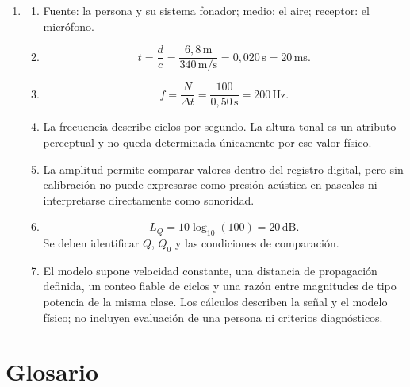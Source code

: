 \begin{enumerate}[label=\textbf{I\arabic*.},leftmargin=*]
    \item
    \begin{enumerate}[label=\alph*)]
        \item Fuente: la persona y su sistema fonador; medio: el aire; receptor: el micrófono.
        \item
        \[
            t=\frac{d}{c}
            =\frac{6{,}8\,\text{m}}{340\,\text{m}/\text{s}}
            =0{,}020\,\text{s}
            =20\,\text{ms}.
        \]
        \item
        \[
            f=\frac{N}{\Delta t}
            =\frac{100}{0{,}50\,\text{s}}
            =200\,\text{Hz}.
        \]
        \item La frecuencia describe ciclos por segundo. La altura tonal es un atributo perceptual y no queda determinada únicamente por ese valor físico.
        \item La amplitud permite comparar valores dentro del registro digital, pero sin calibración no puede expresarse como presión acústica en pascales ni interpretarse directamente como sonoridad.
        \item
        \[
            L_Q=10\log_{10}(100)=20\,\text{dB}.
        \]
        Se deben identificar \(Q\), \(Q_0\) y las condiciones de comparación.
        \item El modelo supone velocidad constante, una distancia de propagación definida, un conteo fiable de ciclos y una razón entre magnitudes de tipo potencia de la misma clase. Los cálculos describen la señal y el modelo físico; no incluyen evaluación de una persona ni criterios diagnósticos.
    \end{enumerate}
\end{enumerate}

\section{Glosario}
\label{sec:u1-glosario}


